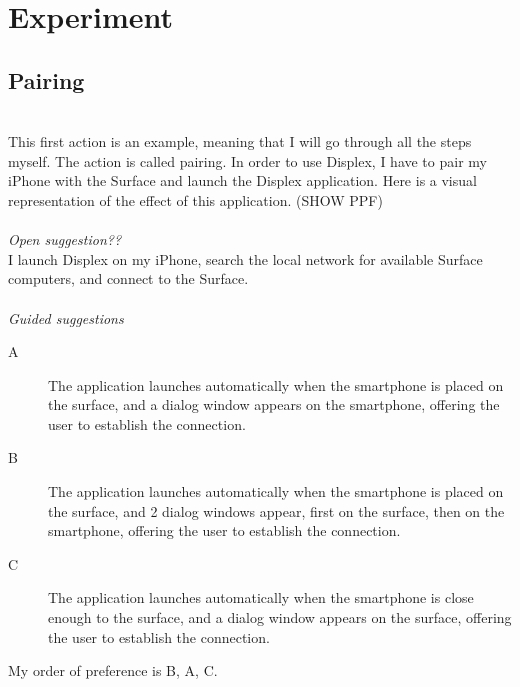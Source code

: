 

\section{Experiment}

\subsection{Pairing}
\hfill\\
This first action is an example, meaning that I will go through all the steps myself.
The action is called pairing.
In order to use Displex, I have to pair my iPhone with the Surface and launch the Displex application. Here is a visual representation of the effect of this application.
(SHOW PPF)
\\\\
\emph{Open suggestion??}\\
I launch Displex on my iPhone, search the local network for available Surface computers, and connect to the Surface.
\\\\
\emph{Guided suggestions}
\begin{description}
\item[A]{The application launches automatically when the smartphone is placed on the surface, and a dialog window appears on the smartphone, offering the user to establish the connection.}
\item[B]{The application launches automatically when the smartphone is placed on the surface, and 2 dialog windows appear, first on the surface, then on the smartphone, offering the user to establish the connection.}
\item[C]{The application launches automatically when the smartphone is close enough to the surface, and a dialog window appears on the surface, offering the user to establish the connection.}
\end{description}

My order of preference is B, A, C.


